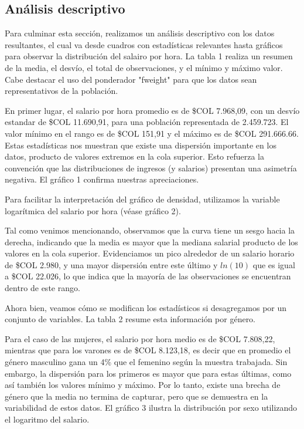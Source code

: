 \documentclass[11pt,oneside]{article}
\begin{document}
	\subsection{Análisis descriptivo}
	
	Para culminar esta sección, realizamos un análisis descriptivo con los datos resultantes, el cual va desde cuadros con estadísticas relevantes hasta gráficos para observar la distribución del salairo por hora. La tabla 1 realiza un resumen de la media, el desvío, el total de observaciones, y el mínimo y máximo valor. Cabe destacar el uso del ponderador "fweight" para que los datos sean representativos de la población.
	
	
	En primer lugar, el salario por hora promedio es de \$COL 7.968,09, con un desvío estandar de \$COL 11.690,91, para una población representada de 2.459.723. El valor mínimo en el rango es de \$COL 151,91 y el máximo es de \$COL 291.666.66. Estas estadísticas nos muestran que existe una dispersión importante en los datos, producto de valores extremos en la cola superior. Esto refuerza la convención que las distribuciones de ingresos (y salarios) presentan una asimetría negativa. El gráfico 1 confirma nuestras apreciaciones.
	
	
	Para facilitar la interpretación del gráfico de densidad, utilizamos la variable logarítmica del salario por hora (véase gráfico 2).
	
	
	Tal como venimos mencionando, observamos que la curva tiene un sesgo hacia la derecha, indicando que la media es mayor que la mediana salarial producto de los valores en la cola superior. Evidenciamos un pico alrededor de un salario horario de \$COL 2.980, y una mayor dispersión entre este último y $ln(10)$ que es igual a \$COL 22.026, lo que indica que la mayoría de las observaciones se encuentran dentro de este rango. 
	
	Ahora bien, veamos cómo se modifican los estadísticos si desagregamos por un conjunto de variables. La tabla 2 resume esta información por género. 
	
	
	Para el caso de las mujeres, el salario por hora medio es de \$COL 7.808,22, mientras que para los varones es de \$COL 8.123,18, es decir que en promedio el género masculino gana un 4\% que el femenino según la muestra trabajada. Sin embargo, la dispersión para los primeros es mayor que para estas últimas, como así también los valores mínimo y máximo. Por lo tanto, existe una brecha de género que la media no termina de capturar, pero que se demuestra en la variabilidad de estos datos. El gráfico 3 ilustra la distribución por sexo utilizando el logaritmo del salario. 
	
\end{document}

